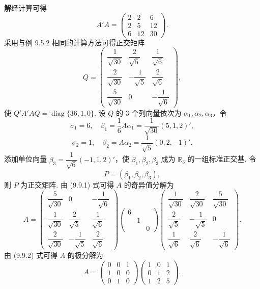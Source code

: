 \documentclass[UTF8,12pt,a4paper,fontset=fandol]{ctexart}
\begin{document}
\noindent\textbf{解}\quad 经计算可得
\[
  A'A=
  \left(\begin{array}{ccc}
    2 & 2 & 6\\
    2 & 5 & 12\\
    6 & 12 & 30
  \end{array}\right).
\]
采用与例 9.5.2 相同的计算方法可得正交矩阵
\[
  Q=
  \left(\begin{array}{ccc}
    \dfrac1{\sqrt{30}} & \dfrac2{\sqrt5} & \dfrac1{\sqrt6}\\
    \dfrac2{\sqrt{30}} & -\dfrac1{\sqrt5} & \dfrac2{\sqrt6}\\
    \dfrac5{\sqrt{30}} & 0 & -\dfrac1{\sqrt6}
  \end{array}\right),
\]
使 $Q'A'AQ=\operatorname{diag}\{36,1,0\}$. 设 $Q$ 的 $3$ 个列向量依次为 $\alpha_1,\alpha_2,\alpha_3$，令
\[
  \sigma_1=6,\quad \beta_1=\frac16A\alpha_1=\frac1{\sqrt{30}}(5,1,2)',
\]
\[
  \sigma_2=1,\quad \beta_2=A\alpha_2=\frac1{\sqrt5}(0,2,-1)'.
\]
添加单位向量 $\beta_3=\dfrac1{\sqrt6}(-1,1,2)'$，使 $\beta_1,\beta_2,\beta_3$ 成为 $\mathbb R_3$ 的一组标准正交基. 令
\[
  P=(\beta_1,\beta_2,\beta_3),
\]
则 $P$ 为正交矩阵. 由 (9.9.1) 式可得 $A$ 的奇异值分解为
\[
  A=
  \left(\begin{array}{ccc}
    \dfrac5{\sqrt{30}} & 0 & -\dfrac1{\sqrt6}\\
    \dfrac1{\sqrt{30}} & \dfrac2{\sqrt5} & \dfrac1{\sqrt6}\\
    \dfrac2{\sqrt{30}} & -\dfrac1{\sqrt5} & \dfrac2{\sqrt6}
  \end{array}\right)
  \left(\begin{array}{ccc}
    6 & &\\
    & 1 &\\
    & & 0
  \end{array}\right)
  \left(\begin{array}{ccc}
    \dfrac1{\sqrt{30}} & \dfrac2{\sqrt{30}} & \dfrac5{\sqrt{30}}\\
    \dfrac2{\sqrt5} & -\dfrac1{\sqrt5} & 0\\
    \dfrac1{\sqrt6} & \dfrac2{\sqrt6} & -\dfrac1{\sqrt6}
  \end{array}\right).
\]
由 (9.9.2) 式可得 $A$ 的极分解为
\[
  A=
  \left(\begin{array}{ccc}
    0 & 0 & 1\\
    1 & 0 & 0\\
    0 & 1 & 0
  \end{array}\right)
  \left(\begin{array}{ccc}
    1 & 0 & 1\\
    0 & 1 & 2\\
    1 & 2 & 5
  \end{array}\right).
\]
\end{document}
